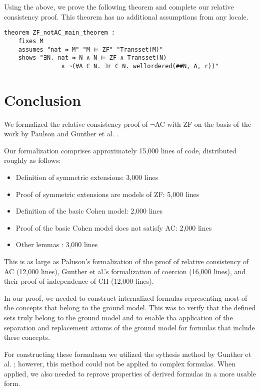 \documentclass{report}
\newenvironment{isaframe}{\begin{mdframed}[topline=false, rightline=false, bottomline=false]}{\end{mdframed}}
\begin{document}
Using the above, we prove the following theorem and complete our relative consistency proof.
This theorem has no additional assumptions from any locale.
\begin{isaframe}
\begin{verbatim}
theorem ZF_notAC_main_theorem :
    fixes M 
    assumes "nat ≈ M" "M ⊨ ZF" "Transset(M)" 
    shows "∃N. nat ≈ N ∧ N ⊨ ZF ∧ Transset(N) 
                ∧ ¬(∀A ∈ N. ∃r ∈ N. wellordered(##N, A, r))" 
\end{verbatim}
\end{isaframe}

\chapter{Conclusion}

We formalized the relative consistency proof of $\neg$AC with ZF
on the basis of the work by Paulson \cite{paulson_AC_consistency} and Gunther et al. \cite{gunther_forcing}.

Our formalization comprises approximately 15,000 lines of code, 
distributed roughly as follows:
\begin{itemize}
  \item Definition of symmetric extensions: 3,000 lines
  \item Proof of symmetric extensions are models of ZF: 5,000 lines
  \item Definition of the basic Cohen model: 2,000 lines
  \item Proof of the basic Cohen model does not satisfy AC: 2,000 lines
  \item Other lemmas : 3,000 lines
\end{itemize}
This is as large as Paluson's formalization of the proof of relative consistency of AC (12,000 lines), 
Gunther et al.'s formalization of coercion (16,000 lines), 
and their proof of independence of CH (12,000 lines).

In our proof, we needed to construct internalized formulas 
representing most of the concepts that belong to the ground model. 
This was to verify that the defined sets truly belong to the ground model 
and to enable tha application of the separation and replacement axioms of the ground model for formulas that include these concepts.

For constructing these formulasm we utilized the sythesis method by Gunther et al. \cite{gunther_forcing};
however, this method could not be applied to complex formulas.
When applied, we also needed to reprove properties of derived formulas in a more usable form.
\end{document}
